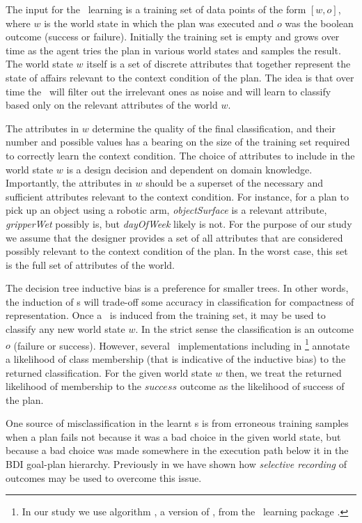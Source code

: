 The input for the \dt\ learning is a training set of data points of the form $[w,o]$, where $w$ is the world state in which the plan was executed and $o$ was the boolean outcome (success or failure). Initially the training set is empty and grows over time as the agent tries the plan in various world states and samples the result. The world state $w$ itself is a set of discrete attributes that together represent the state of affairs relevant to the context condition of the plan. The idea is that over time the \dt\ will filter out the irrelevant ones as noise and will learn to classify based only on the relevant attributes of the world $w$. 

The attributes in $w$ determine the quality of the final classification, and their number and possible values has a bearing on the size of the training set required to correctly learn the context condition. The choice of attributes to include in the world state $w$ is a design decision and dependent on domain knowledge. Importantly, the attributes in $w$ should be a superset of the necessary and sufficient attributes relevant to the context condition. For instance, for a plan to pick up an object using a robotic arm, \textit{objectSurface} is a relevant attribute, \textit{gripperWet} possibly is, but \textit{dayOfWeek} likely is not. For the purpose of our study we assume that the designer provides a set of all attributes that are considered possibly relevant to the context condition of the plan. In the worst case, this set is the full set of attributes of the world. 

The decision tree inductive bias is a preference for smaller trees. In other words, the induction of \dt s will trade-off some accuracy in classification for compactness of representation. Once a \dt\ is induced from the training set, it may be used to classify any new world state $w$. In the strict sense the classification is an outcome $o$ (failure or success). However, several \dt\ implementations including  in \weka\footnote{In our study we use algorithm , a version of  \cite{Mitchell97:ML}, from the \weka\ learning package \cite{weka99}.} annotate a likelihood of class membership (that is indicative of the inductive bias) to the returned classification. For the given world state $w$ then, we treat the returned likelihood of membership to the $success$ outcome as the likelihood of success of the plan.

One source of misclassification in the learnt \dt s is from erroneous training samples when a plan fails not because it was a bad choice in the given world state, but because a bad choice was made somewhere in the execution path below it in the BDI goal-plan hierarchy. Previously in \cite{Airiau:IJAT:09} we have shown how \textit{selective recording} of outcomes may be used to overcome this issue.

